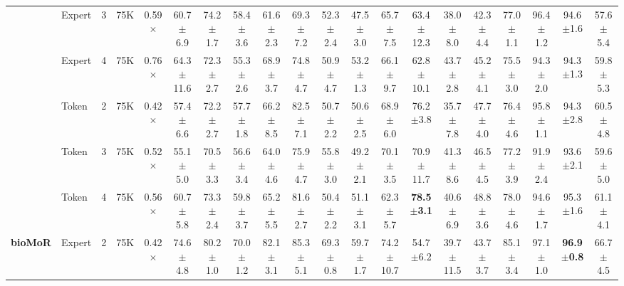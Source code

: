{\begin{tabular}{l l c c c c c c c c c c c c c c c c c c}
 & Expert & 3 & 75K & 0.59$\times$ & 60.7{\scriptsize$\pm$6.9} & 74.2{\scriptsize$\pm$1.7} & 58.4{\scriptsize$\pm$3.6} & 61.6{\scriptsize$\pm$2.3} & 69.3{\scriptsize$\pm$7.2} & 52.3{\scriptsize$\pm$2.4} & 47.5{\scriptsize$\pm$3.0} & 65.7{\scriptsize$\pm$7.5} & 63.4{\scriptsize$\pm$12.3} & 38.0{\scriptsize$\pm$8.0} & 42.3{\scriptsize$\pm$4.4} & 77.0{\scriptsize$\pm$1.1} & 96.4{\scriptsize$\pm$1.2} & 94.6{\scriptsize$\pm$1.6} & 57.6{\scriptsize$\pm$5.4} \\
 & Expert & 4 & 75K & 0.76$\times$ & 64.3{\scriptsize$\pm$11.6} & 72.3{\scriptsize$\pm$2.7} & 55.3{\scriptsize$\pm$2.6} & 68.9{\scriptsize$\pm$3.7} & 74.8{\scriptsize$\pm$4.7} & 50.9{\scriptsize$\pm$4.7} & 53.2{\scriptsize$\pm$1.3} & 66.1{\scriptsize$\pm$9.7} & 62.8{\scriptsize$\pm$10.1} & 43.7{\scriptsize$\pm$2.8} & 45.2{\scriptsize$\pm$4.1} & 75.5{\scriptsize$\pm$3.0} & 94.3{\scriptsize$\pm$2.0} & 94.3{\scriptsize$\pm$1.3} & 59.8{\scriptsize$\pm$5.3} \\
 & Token & 2 & 75K & 0.42$\times$ & 57.4{\scriptsize$\pm$6.6} & 72.2{\scriptsize$\pm$2.7} & 57.7{\scriptsize$\pm$1.8} & 66.2{\scriptsize$\pm$8.5} & 82.5{\scriptsize$\pm$7.1} & 50.7{\scriptsize$\pm$2.2} & 50.6{\scriptsize$\pm$2.5} & 68.9{\scriptsize$\pm$6.0} & 76.2{\scriptsize$\pm$3.8} & 35.7{\scriptsize$\pm$7.8} & 47.7{\scriptsize$\pm$4.0} & 76.4{\scriptsize$\pm$4.6} & 95.8{\scriptsize$\pm$1.1} & 94.3{\scriptsize$\pm$2.8} & 60.5{\scriptsize$\pm$4.8} \\
 & Token & 3 & 75K & 0.52$\times$ & 55.1{\scriptsize$\pm$5.0} & 70.5{\scriptsize$\pm$3.3} & 56.6{\scriptsize$\pm$3.4} & 64.0{\scriptsize$\pm$4.6} & 75.9{\scriptsize$\pm$4.7} & 55.8{\scriptsize$\pm$3.0} & 49.2{\scriptsize$\pm$2.1} & 70.1{\scriptsize$\pm$3.5} & 70.9{\scriptsize$\pm$11.7} & 41.3{\scriptsize$\pm$8.6} & 46.5{\scriptsize$\pm$4.5} & 77.2{\scriptsize$\pm$3.9} & 91.9{\scriptsize$\pm$2.4} & 93.6{\scriptsize$\pm$2.1} & 59.6{\scriptsize$\pm$5.0} \\
 & Token & 4 & 75K & 0.56$\times$ & 60.7{\scriptsize$\pm$5.8} & 73.3{\scriptsize$\pm$2.4} & 59.8{\scriptsize$\pm$3.7} & 65.2{\scriptsize$\pm$5.5} & 81.6{\scriptsize$\pm$2.7} & 50.4{\scriptsize$\pm$2.2} & 51.1{\scriptsize$\pm$3.1} & 62.3{\scriptsize$\pm$5.7} & \textbf{78.5{\scriptsize$\pm$3.1}} & 40.6{\scriptsize$\pm$6.9} & 48.8{\scriptsize$\pm$3.6} & 78.0{\scriptsize$\pm$4.6} & 94.6{\scriptsize$\pm$1.7} & 95.3{\scriptsize$\pm$1.6} & 61.1{\scriptsize$\pm$4.1} \\
\midrule
\textbf{bioMoR} & Expert & 2 & 75K & 0.42$\times$ & 74.6{\scriptsize$\pm$4.8} & 80.2{\scriptsize$\pm$1.0} & 70.0{\scriptsize$\pm$1.2} & 82.1{\scriptsize$\pm$3.1} & 85.3{\scriptsize$\pm$5.1} & 69.3{\scriptsize$\pm$0.8} & 59.7{\scriptsize$\pm$1.7} & 74.2{\scriptsize$\pm$10.7} & 54.7{\scriptsize$\pm$6.2} & 39.7{\scriptsize$\pm$11.5} & 43.7{\scriptsize$\pm$3.7} & 85.1{\scriptsize$\pm$3.4} & 97.1{\scriptsize$\pm$1.0} & \textbf{96.9{\scriptsize$\pm$0.8}} & 66.7{\scriptsize$\pm$4.5} \\

\end{tabular}}
